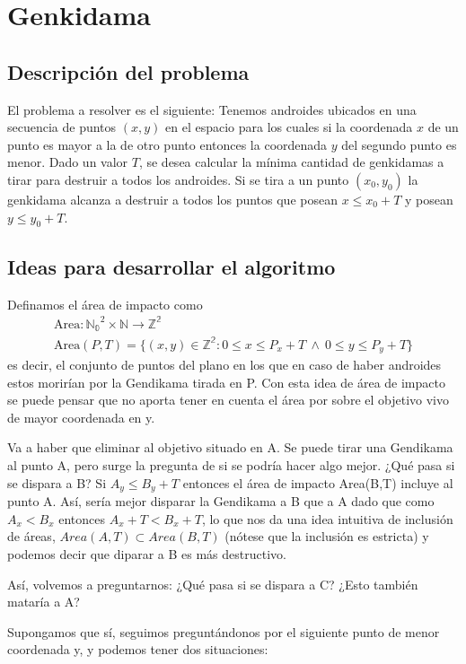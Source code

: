 \documentclass[10pt,a4paper]{article}
\begin{document}

\section{Genkidama}

\subsection{Descripción del problema}

El problema a resolver es el siguiente:
Tenemos androides ubicados en una secuencia de puntos $(x,y)$ en el espacio para los cuales si la coordenada $x$ de un punto es mayor a la de otro punto entonces la coordenada $y$ del segundo punto es menor. Dado un valor $T$, se desea calcular la mínima cantidad de genkidamas a tirar para destruir a todos los androides. Si se tira a un punto $(x_{0},y_{0})$ la genkidama alcanza a destruir a todos los puntos que posean $x \leq x_{0} + T$ y posean $y \leq y_{0} + T$.

\subsection{Ideas para desarrollar el algoritmo}

Definamos el área de impacto como
\begin{gather*}
\textrm{Area}:\mathbb{N_{0}}^2 \times \mathbb{N} \rightarrow \mathbb{Z^2}\\
 \textrm{Area}(P,T) = \{ (x, y) \in \mathbb{Z^2} : 0 \leq x \leq P_{x}+T ~ \wedge ~ 0 \leq y \leq P_{y}+T \}
\end{gather*}
 es decir, el conjunto de puntos del plano en los que en caso de haber androides estos morirían por la Gendikama tirada en P. Con esta idea de área de impacto se puede pensar que no aporta tener en cuenta el área por sobre el objetivo vivo de mayor coordenada en y.
\par{Va a haber que eliminar al objetivo situado en A. Se puede tirar una Gendikama al punto A, pero surge la pregunta de si se podría hacer algo mejor. ¿Qué pasa si se dispara a B? Si $ A_{y} \leq B_{y}+T$ entonces el área de impacto Area(B,T) incluye al punto A. Así, sería mejor disparar la Gendikama a B que a A dado que como  $A_{x} < B_{x}$ entonces  $A_{x}+T < B_{x}+T$, lo que nos da una idea intuitiva de inclusión de áreas, $Area(A,T) \subset Area(B,T)$ (nótese que la inclusión es estricta) y podemos decir que diparar a B es más destructivo.}
\par{Así, volvemos a preguntarnos: ¿Qué pasa si se dispara a C? ¿Esto también mataría a A?}
\par{Supongamos que sí, seguimos preguntándonos por el siguiente punto de menor coordenada y, y podemos tener dos situaciones:}
\end{document}

